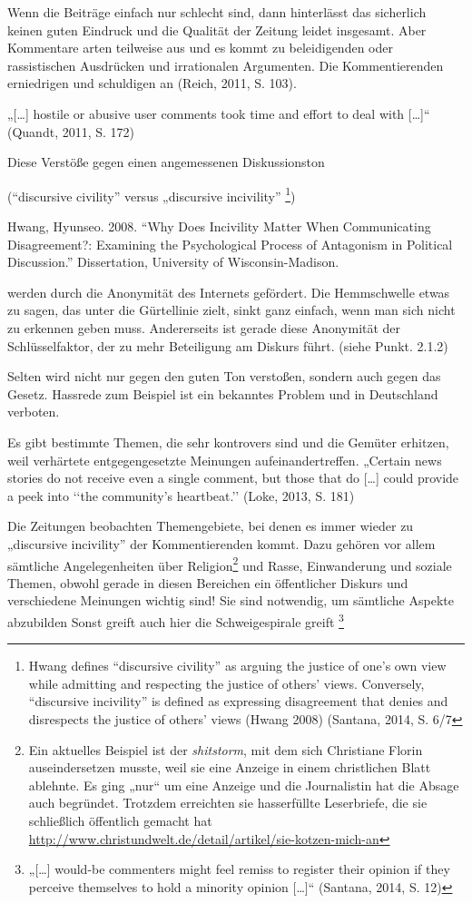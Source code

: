 Wenn die Beiträge einfach nur schlecht sind, dann hinterlässt das sicherlich
keinen guten Eindruck und die Qualität der Zeitung leidet insgesamt. Aber
Kommentare arten teilweise aus und es kommt zu beleidigenden oder rassistischen
Ausdrücken und irrationalen Argumenten. Die Kommentierenden erniedrigen und
schuldigen an (Reich, 2011, S. 103).

„[\ldots] hostile or abusive user comments took time and effort to deal with
[\ldots]“ (Quandt, 2011, S. 172)

Diese Verstöße gegen einen angemessenen Diskussionston

(“discursive civility” versus „discursive incivility” \footnote{Hwang defines
“discursive civility” as arguing the justice of one’s own view while admitting
and respecting the justice of others’ views. Conversely, “discursive incivility”
is defined as expressing disagreement that denies and disrespects the justice of
others’  views (Hwang 2008) (Santana, 2014, S. 6/7})




Hwang, Hyunseo. 2008. “Why Does Incivility Matter When Communicating Disagreement?:
Examining the Psychological Process of Antagonism in Political Discussion.” Dissertation,
University of Wisconsin-Madison.

werden durch die Anonymität des Internets gefördert. Die Hemmschwelle etwas zu
sagen, das unter die Gürtellinie zielt, sinkt ganz einfach, wenn man sich nicht
zu erkennen geben muss. Andererseits ist gerade diese Anonymität der
Schlüsselfaktor, der zu mehr Beteiligung am Diskurs führt. (siehe Punkt. 2.1.2)

Selten wird nicht nur gegen den guten Ton verstoßen, sondern auch gegen das
Gesetz. Hassrede zum Beispiel ist ein bekanntes Problem und in Deutschland
verboten.

Es gibt bestimmte Themen, die sehr kontrovers sind und die Gemüter erhitzen,
weil verhärtete entgegengesetzte Meinungen aufeinandertreffen.   „Certain news
stories do not receive even a single comment, but those that do [\ldots] could
provide a peek into ‘‘the community’s heartbeat.’’ (Loke, 2013, S. 181)


Die Zeitungen beobachten Themengebiete, bei denen es immer wieder zu „discursive
incivility” der Kommentierenden kommt. Dazu gehören vor allem sämtliche
Angelegenheiten über Religion\footnote{Ein aktuelles Beispiel ist der
{\slshape shitstorm}, mit dem sich Christiane Florin auseindersetzen musste, weil
sie eine Anzeige in einem christlichen Blatt ablehnte. Es ging „nur“ um eine
Anzeige und die Journalistin hat die Absage auch begründet. Trotzdem erreichten
sie hasserfüllte Leserbriefe, die sie schließlich öffentlich gemacht hat
\url{http://www.christundwelt.de/detail/artikel/sie-kotzen-mich-an}} und Rasse,
Einwanderung und soziale Themen, obwohl gerade in diesen Bereichen ein
öffentlicher Diskurs und verschiedene Meinungen wichtig sind! Sie sind
notwendig, um sämtliche Aspekte abzubilden Sonst greift auch hier die
Schweigespirale greift \footnote{„[\ldots] would-be commenters might feel remiss
to register their opinion if they perceive themselves to hold a minority opinion
[\ldots]“ (Santana, 2014, S. 12)}


